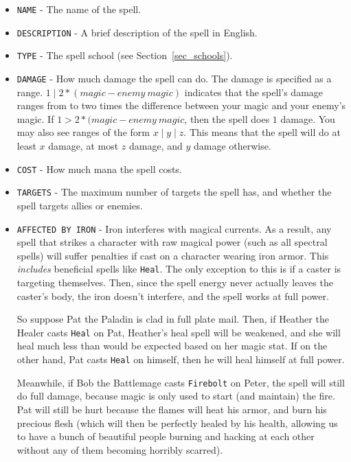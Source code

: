 \documentclass{report}
\begin{document}
\begin{itemize}
\begin{itemize}
\begin{itemize}
    \item \verb|NAME| - The name of the spell.
    \item \verb|DESCRIPTION| - A brief description of the spell in English.
    \item \verb|TYPE| - The spell school (see Section~\ref{sec_schools}).
    \item \verb|DAMAGE| - How much damage the spell can do. The damage is specified
    as a range. $1 \mid 2*(\mathit{magic} - \mathit{enemy~magic})$ indicates that the
    spell's damage ranges from to two times the difference between your magic
    and your enemy's magic. If $1 > 2*(\mathit{magic} - \mathit{enemy~magic}$, then
    the spell does $1$ damage. You may also see ranges of the form
    $x \mid y \mid z$. This means that the spell will do at least $x$ damage, at most
    $z$ damage, and $y$ damage otherwise. 
    \item \verb|COST| - How much mana the spell costs.
    \item \verb|TARGETS| - The maximum number of targets the spell has, and whether the spell
    targets allies or enemies.
    \item \verb|AFFECTED BY IRON| - Iron interferes with magical currents. 
    As a result, any spell that strikes a character with raw magical power (such
    as all spectral spells) will suffer penalties if cast on a character wearing
    iron armor. This \emph{includes} beneficial spells like \verb|Heal|. The only
    exception to this is if a caster is targeting themselves. Then, since the 
    spell energy never actually leaves the caster's body, the iron doesn't 
    interfere, and the spell works at full power.

    So suppose Pat the Paladin is clad in full plate mail. Then, if Heather the 
    Healer casts \verb|Heal| on Pat, Heather's heal spell will be weakened, and she will
    heal much less than would be expected based on her magic stat. If on the
    other hand, Pat casts \verb|Heal| on himself, then he will heal himself at full
    power.

    Meanwhile, if Bob the Battlemage casts \verb|Firebolt| on Peter, the spell will still
    do full damage, because magic is only used to start (and maintain) the fire.
    Pat will still be hurt because the flames will heat his armor, and burn his
    precious flesh (which will then be perfectly healed by his health,
    allowing us to have a bunch of beautiful people burning and hacking at each
    other without any of them becoming horribly scarred).


\end{itemize}
\end{itemize}
\end{itemize}
\end{document}
